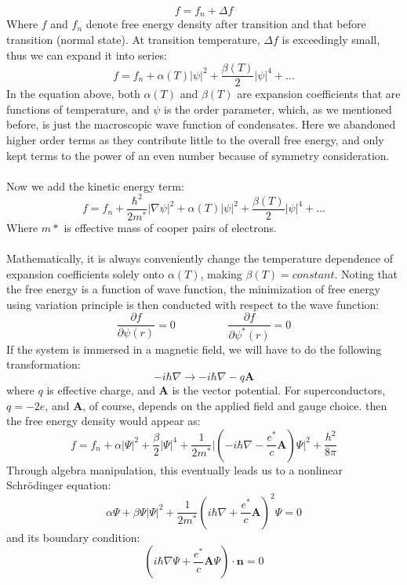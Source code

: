 \documentclass[11pt]{article}
\newcommand{\pd}{\partial}
\renewcommand{\vec}[1]{\mathbf{#1}}
\begin{document}
$$
f=f_n+\Delta f
$$
Where $f$ and $f_n$ denote free energy density after transition and that before transition (normal state). At transition temperature, $\Delta f$ is exceedingly small, thus we can expand it into series:\\
$$
f=f_n+\alpha(T)|\psi|^2+\frac{\beta(T)}{2}|\psi|^4+...
$$
In the equation above, both $\alpha(T)$ and $\beta(T)$ are expansion coefficients that are functions of temperature, and $\psi$ is the order parameter, which, as we mentioned before, is just the macroscopic wave function of condensates. Here we abandoned higher order terms as they contribute little to the overall free energy, and only kept terms to the power of an even number because of symmetry consideration.\\
\\
Now we add the kinetic energy term:\\
$$
f=f_n+\frac{\hbar^2}{2m^*}|\nabla\psi|^2+\alpha(T)|\psi|^2+\frac{\beta(T)}{2}|\psi|^4+...
$$
Where $m*$ is effective mass of cooper pairs of electrons.\\
\\
Mathematically, it is always conveniently change the temperature dependence of expansion coefficients solely onto $\alpha(T)$, making $\beta(T)=constant$.
Noting that the free energy is a function of wave function, the minimization of free energy using variation principle is then conducted with respect to the wave function:\\
$$
\frac{\pd f}{\pd \psi(r)}=0
\hspace{2cm}
\frac{\pd f}{\pd \psi^*(r)}=0
$$
If the system is immersed in a magnetic field, we will have to do the following transformation:\\
$$
-i\hbar\nabla\rightarrow-i\hbar\nabla-q\vec{A}
$$
where $q$ is effective charge, and $\vec{A}$ is the vector potential. For superconductors, $q=-2e$, and $\vec{A}$, of course, depends on the applied field and gauge choice.
then the free energy density would appear as:\\
$$
f=f_n+\alpha|\Psi|^2+\frac{\beta}{2}|\Psi|^4+\frac{1}{2m^*}\bigg|(-i\hbar\nabla-\frac{e^*}{c}\vec{A})\Psi\bigg|^2+\frac{h^2}{8\pi}
$$
Through algebra manipulation, this eventually leads us to a nonlinear Schr\"{o}dinger equation:\\
$$
\alpha\Psi+\beta\Psi|\Psi|^2+\frac{1}{2m^*}\left(i\hbar\nabla+\frac{e^*}{c}\vec{A}\right)^2\Psi=0
$$
and its boundary condition:\\
$$
\left(i\hbar\nabla\Psi+\frac{e^*}{c}\vec{A}\Psi\right)\cdot\vec{n}=0
$$
\end{document}
